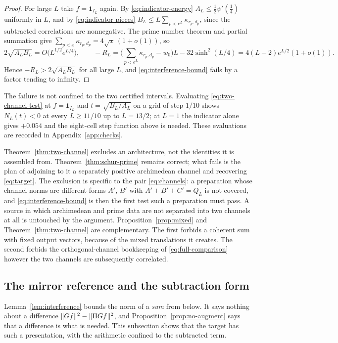 \begin{proof}
For large $L$ take $f=\mathbf 1_{I_L}$ again. By \eqref{eq:indicator-energy}
$A_L\leq\tfrac12\psi'(\tfrac14)$ uniformly in $L$, and by
\eqref{eq:indicator-pieces} $B_L\leq L\sum_{p<e^L}\kappa_{r_p,d_p}$, since
the subtracted correlations are nonnegative. The prime number theorem and
partial summation give
$\sum_{p<x}\kappa_{r_p,d_p}=4\sqrt x\,(1+o(1))$, so
\[
 2\sqrt{A_LB_L}=O\big(L^{1/2}e^{L/4}\big),
 \qquad
 -R_L=\Big(\sum_{p<e^L}\kappa_{r_p,d_p}-w_0\Big)L-32\sinh^2(L/4)
 =4(L-2)e^{L/2}(1+o(1)).
\]
Hence $-R_L>2\sqrt{A_LB_L}$ for all large $L$, and
\eqref{eq:interference-bound} fails by a factor tending to infinity.
\end{proof}

\begin{remark}\label{rem:scan}
The failure is not confined to the two certified intervals. Evaluating
\eqref{eq:two-channel-test} at $f=\mathbf 1_{I_L}$ and $t=\sqrt{B_L/A_L}$
on a grid of step $1/10$ shows $N_L(t)<0$ at every $L\geq11/10$ up to
$L=13/2$; at $L=1$ the indicator alone gives $+0.054$ and the eight-cell
step function above is needed. These evaluations are recorded in
Appendix~\ref{app:checks}.
\end{remark}

Theorem~\ref{thm:two-channel} excludes an architecture, not the identities it
is assembled from. Theorem~\ref{thm:schur-prime} remains correct; what fails
is the plan of adjoining to it a separately positive archimedean channel and
recovering \eqref{eq:target}. The exclusion is specific to the pair
\eqref{eq:channels}: a preparation whose channel norms are different forms
$A'$, $B'$ with $A'+B'+C'=Q_L$ is not covered, and
\eqref{eq:interference-bound} is then the first test such a preparation must
pass. A source in which archimedean and prime data are not separated into two
channels at all is untouched by the argument.
Proposition~\ref{prop:mixed} and Theorem~\ref{thm:two-channel} are
complementary. The first forbids a coherent sum with fixed output vectors,
because of the mixed translations it creates. The second forbids the
orthogonal-channel bookkeeping of \eqref{eq:full-comparison} however the two
channels are subsequently correlated.

\subsection{The mirror reference and the subtraction form}
\label{subsec:subtraction}
Lemma~\ref{lem:interference} bounds the norm of a \emph{sum} from below. It
says nothing about a difference $\lVert Gf\rVert^2-\lVert \Pi Gf\rVert^2$, and
Proposition~\ref{prop:no-augment} says that a difference is what is needed.
This subsection shows that the target has such a presentation, with the
arithmetic confined to the subtracted term.

